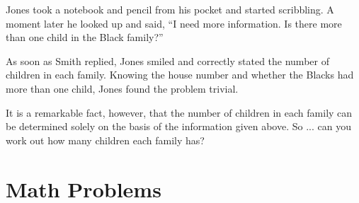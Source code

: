 \documentclass[12pt]{article}
\begin{document}
\begin{itemize}
Jones took a notebook and pencil from his pocket and started scribbling. A moment later he looked up and said, ``I need more information. Is there more than one child in the Black family?''

As soon as Smith replied, Jones smiled and correctly stated the number of children in each family.  Knowing the house number and whether the Blacks had more than one child, Jones found the problem trivial.

 It is a remarkable fact, however, that the number of children in each family can be determined solely on the basis of the information given above.  So ... can you work out how many children each family has?
\end{itemize}

\section{Math Problems}
\end{document}
